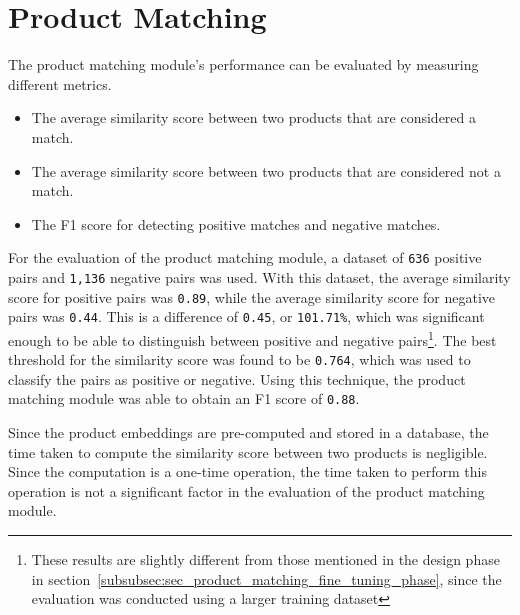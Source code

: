 \section{Product Matching}\label{sec:product_matching_evaluation}

The product matching module's performance can be evaluated by measuring different metrics.
\begin{itemize}
    \item The average similarity score between two products that are considered a match.
    \item The average similarity score between two products that are considered not a match.
    \item The F1 score for detecting positive matches and negative matches.
\end{itemize}

For the evaluation of the product matching module, a dataset of \texttt{636} positive pairs and \texttt{1,136} negative pairs was used.
With this dataset, the average similarity score for positive pairs was \texttt{0.89}, while the average similarity score for negative pairs was \texttt{0.44}.
This is a difference of \texttt{0.45}, or \texttt{101.71\%}, which was significant enough to be able to distinguish between positive and negative pairs\footnote{These results are slightly different from those mentioned in the design phase in section~\ref{subsubsec:sec_product_matching_fine_tuning_phase}, since the evaluation was conducted using a larger training dataset}.
The best threshold for the similarity score was found to be \texttt{0.764}, which was used to classify the pairs as positive or negative.
Using this technique, the product matching module was able to obtain an F1 score of \texttt{0.88}.

Since the product embeddings are pre-computed and stored in a database, the time taken to compute the similarity score between two products is negligible.
Since the computation is a one-time operation, the time taken to perform this operation is not a significant factor in the evaluation of the product matching module.